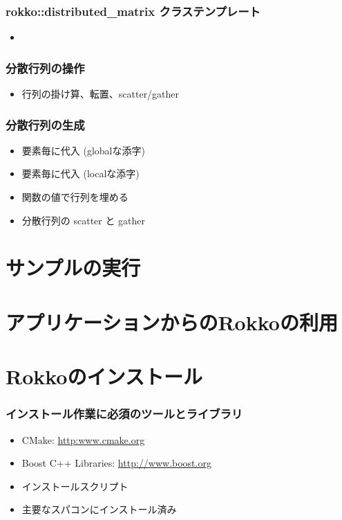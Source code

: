 \begin{frame}
  \frametitle{rokko::distributed\_matrix クラステンプレート}
  \begin{itemize}
  \item 
  \end{itemize}
\end{frame}

\begin{frame}
  \frametitle{分散行列の操作}
  \begin{itemize}
  \item 行列の掛け算、転置、scatter/gather
  \end{itemize}
\end{frame}

\begin{frame}
  \frametitle{分散行列の生成}
  \begin{itemize}
  \item 要素毎に代入 (globalな添字)
  \item 要素毎に代入 (localな添字)
  \item 関数の値で行列を埋める
  \item 分散行列の scatter と gather
  \end{itemize}
\end{frame}

\section{サンプルの実行}
\section{アプリケーションからのRokkoの利用}

\section{Rokkoのインストール}

\begin{frame}
  \frametitle{インストール作業に必須のツールとライブラリ}
  \begin{itemize}
  \item CMake: \url{http:www.cmake.org}
  \item Boost C++ Libraries: \url{http://www.boost.org}
  \item インストールスクリプト
  \item 主要なスパコンにインストール済み
  \end{itemize}
\end{frame}

